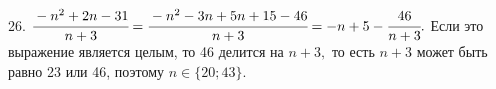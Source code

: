26. $\cfrac{-n^2+2n-31}{n+3}=\cfrac{-n^2-3n+5n+15-46}{n+3}=-n+5-\cfrac{46}{n+3}.$ Если это выражение является целым, то 46 делится на $n+3,$ то есть $n+3$ может быть равно 23 или 46, поэтому $n\in \{20;43\}.$\\
